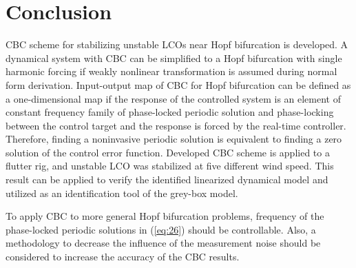 \documentclass[openacc]{rsproca_new}%
\newcommand{\Eref}[1]{(\ref{#1})}
\begin{document}
\section{Conclusion}
CBC scheme for stabilizing unstable LCOs near Hopf bifurcation is developed. A dynamical system with CBC can be simplified to a Hopf bifurcation with single harmonic forcing if weakly nonlinear transformation is assumed during normal form derivation.  Input-output map of CBC for Hopf bifurcation can be defined as a one-dimensional map if the response of the controlled system is an element of constant frequency family of phase-locked periodic solution and phase-locking between the control target and the response is forced by the real-time controller. Therefore, finding a noninvasive periodic solution is equivalent to finding a zero solution of the control error function.  Developed CBC scheme is applied to a flutter rig, and unstable LCO was stabilized at five different wind speed. This result can be applied to verify the identified linearized dynamical model and utilized as an identification tool of the grey-box model.

To apply CBC to more general Hopf bifurcation problems, frequency of the phase-locked periodic solutions in \Eref{eq:26} should be controllable. Also, a methodology to decrease the influence of the measurement noise should be considered to increase the accuracy of the CBC results. \vskip6pt


\enlargethispage{20pt}





\end{document}
